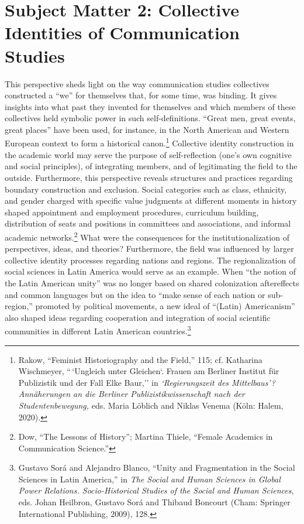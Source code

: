 \documentclass{tufte-handout}
\begin{document}
\hypertarget{subject-matter-2-collective-identities-of-communication-studies}{%
\section{Subject Matter 2: Collective Identities of Communication
Studies}\label{subject-matter-2-collective-identities-of-communication-studies}}

This perspective sheds light on the way communication studies
collectives constructed a ``we'' for themselves that, for some time, was
binding. It gives insights into what past they invented for themselves
and which members of these collectives held symbolic power in such
self-definitions. ``Great men, great events, great places'' have been
used, for instance, in the North American and Western European context
to form a historical canon.\footnote{Rakow, ``Feminist Historiography and the Field,'' 115; cf. Katharina
  Wischmeyer, ``\,`Ungleich unter Gleichen`. Frauen am Berliner Institut
  für Publizistik und der Fall Elke Baur,'' in \emph{`Regierungszeit des
  Mittelbaus'? Annäherungen an die Berliner Publizistikwissenschaft nach
  der Studentenbewegung,} eds. Maria Löblich and Niklas Venema (Köln:
  Halem, 2020).
}
Collective identity construction in the academic world may serve the
purpose of self-reflection (one's own cognitive and social principles),
of integrating members, and of legitimating the field to the outside.
Furthermore, this perspective reveals structures and practices regarding
boundary construction and exclusion. Social categories such as class,
ethnicity, and gender charged with specific value judgments at different
moments in history shaped appointment and employment procedures,
curriculum building, distribution of seats and positions in committees
and associations, and informal academic
networks.\footnote{Dow, ``The Lessons of History''; Martina Thiele, ``Female Academics in
  Communication Science.''
} What were the
consequences for the institutionalization of perspectives, ideas, and
theories? Furthermore, the field was influenced by larger collective
identity processes regarding nations and regions. The regionalization of
social sciences in Latin America would serve as an example. When ``the
notion of the Latin American unity'' was no longer based on shared
colonization aftereffects and common languages but on the idea to ``make
sense of each nation or sub-region,'' promoted by political movements, a
new ideal of ``(Latin) Americanism'' also shaped ideas regarding
cooperation and integration of social scientific communities in
different Latin American
countries.\footnote{Gustavo Sorá and Alejandro Blanco, ``Unity and Fragmentation in the
  Social Sciences in Latin America,'' in \emph{The Social and Human
  Sciences in Global Power Relations. Socio-Historical Studies of the
  Social and Human Sciences}, eds. Johan Heilbron, Gustavo Sorá and
  Thibaud Boncourt (Cham: Springer International Publishing, 2009), 128.
}
\end{document}
